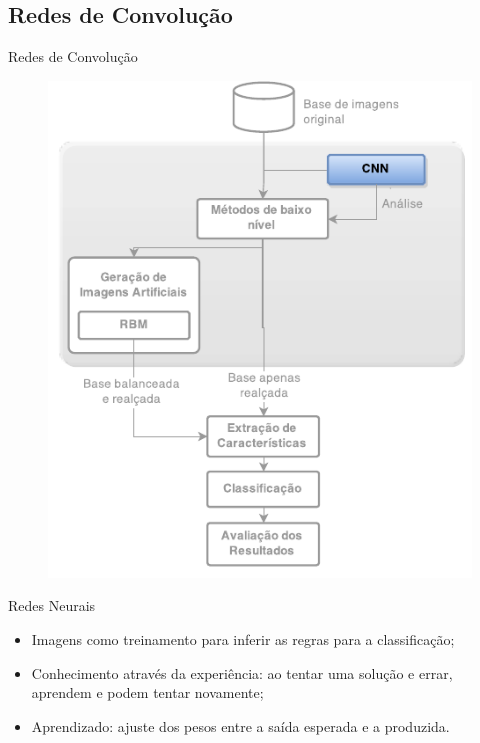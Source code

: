 \documentclass{beamer}
\begin{document}
\subsection{Redes de Convolução}
\begin{frame}{Redes de Convolução}
\begin{figure}
    \includegraphics[height=0.75\textheight]{figuras/geral_cnn.pdf}
\end{figure}
\end{frame}
\begin{frame}{Redes Neurais}
\setlength\leftmargini{0em}
\justifying
  \begin{itemize}
  \item Imagens como treinamento para inferir as regras para a classificação;
  \item Conhecimento através da experiência: ao tentar uma solução e errar, aprendem e podem tentar novamente;
  \item Aprendizado: ajuste dos pesos entre a saída esperada e a produzida.
  \end{itemize}
\end{frame}
\end{document}
